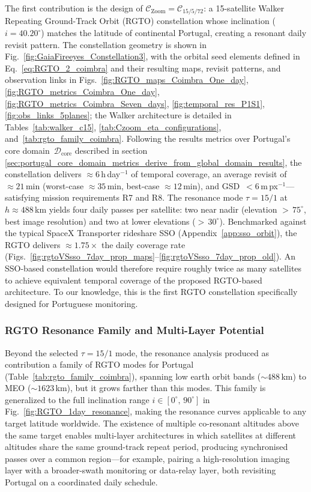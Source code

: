 The first contribution is the design of $\mathcal{C}_{\text{Zoom}} = \mathcal{C}_{15/5/72}$: a 15-satellite Walker Repeating Ground-Track Orbit (RGTO) constellation whose inclination ($i = 40.20^{\circ}$) matches the latitude of continental Portugal, creating a resonant daily revisit pattern. The constellation geometry is shown in Fig.~\ref{fig:GaiaFireeyes_Constellation3}, with the orbital seed elements defined in Eq.~\ref{eq:RGTO_2_coimbra} and their resulting maps, revisit patterns, and observation links in Figs.~\ref{fig:RGTO_maps_Coimbra_One_day}, \ref{fig:RGTO_metrics_Coimbra_One_day}, \ref{fig:RGTO_metrics_Coimbra_Seven_days}, \ref{fig:temporal_res_P1S1}, \ref{fig:obs_links_5planes}; the Walker architecture is detailed in Tables~\ref{tab:walker_c15}, \ref{tab:Czoom_eta_configurations}, and~\ref{tab:rgto_family_coimbra}. Following the results metrics over Portugal's core domain~$\mathcal{D}_{\mathrm{core}}$ described in section \ref{sec:portugal_core_domain_metrics_derive_from_global_domain_results}, the constellation delivers $\approx 6$\,h\,day$^{-1}$ of temporal coverage, an average revisit of $\approx 21$\,min (worst-case $\approx 35$\,min, best-case $\approx 12$\,min), and GSD~$< 6$\,m\,px$^{-1}$---satisfying mission requirements R7 and R8. The resonance mode $\tau = 15/1$ at $h \approx 488$\,km yields four daily passes per satellite: two near nadir (elevation ${>}\,75^{\circ}$, best image resolution) and two at lower elevations (${>}\,30^{\circ}$). Benchmarked against the typical SpaceX Transporter rideshare SSO (Appendix~\ref{app:sso_orbit}), the RGTO delivers $\approx 1.75\times$ the daily coverage rate  (Figs.~\ref{fig:rgtoVSsso_7day_prop_maps}--\ref{fig:rgtoVSsso_7day_prop_old}). An SSO-based constellation would therefore require roughly twice as many satellites to achieve equivalent temporal coverage of the proposed RGTO-based architecture. To our knowledge, this is the first RGTO constellation specifically designed for Portuguese monitoring.

\subsubsection{RGTO Resonance Family and Multi-Layer Potential}

Beyond the selected $\tau = 15/1$ mode, the resonance analysis produced as contribution a family of RGTO modes for Portugal (Table~\ref{tab:rgto_family_coimbra}), spanning low earth orbit bands ($\sim\!488$\,km) to MEO ($\sim\!1623$\,km), but it grows farther than this modes. This family is generalized to the full inclination range $i \in [0^{\circ},\,90^{\circ}]$ in Fig.~\ref{fig:RGTO_1day_resonance}, making the resonance curves applicable to any target latitude worldwide. The existence of multiple co-resonant altitudes above the same target enables multi-layer architectures in which satellites at different altitudes share the same ground-track repeat period, producing synchronised passes over a common region---for example, pairing a high-resolution imaging layer with a broader-swath monitoring or data-relay layer, both revisiting Portugal on a coordinated daily schedule.

